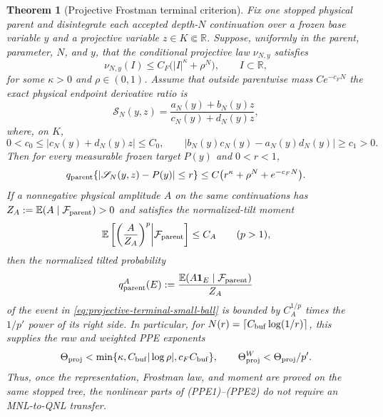 \documentclass[11pt]{article}
\newtheorem{theorem}{Theorem}[section]
\newcommand{\one}{\mathbf 1}
\begin{document}
\begin{theorem}[Projective Frostman terminal criterion]
\label{thm:projective-frostman-terminal-PPE}
Fix one stopped physical parent and disintegrate each accepted depth-$N$
continuation over a frozen base variable $y$ and a projective variable
$z\in K\Subset\mathbb R$.  Suppose, uniformly in the parent, parameter,
$N$, and $y$, that the conditional projective law $\nu_{N,y}$ satisfies
\begin{equation}
\label{eq:projective-terminal-frostman}
 \nu_{N,y}(I)
 \le C_F\bigl(|I|^\kappa+\rho^N\bigr),
 \qquad I\subset\mathbb R,
\end{equation}
for some $\kappa>0$ and $\rho\in(0,1)$.  Assume that outside parentwise
mass $Ce^{-c_FN}$ the exact physical endpoint derivative ratio is
\begin{equation}
\label{eq:projective-terminal-mobius}
 \mathscr S_N(y,z)
 =\frac{a_N(y)+b_N(y)z}{c_N(y)+d_N(y)z},
\end{equation}
where, on $K$,
\begin{equation}
\label{eq:projective-terminal-transversality}
 0<c_0\le |c_N(y)+d_N(y)z|\le C_0,
 \qquad
 |b_N(y)c_N(y)-a_N(y)d_N(y)|\ge c_1>0.
\end{equation}
Then for every measurable frozen target $P(y)$ and $0<r<1$,
\begin{equation}
\label{eq:projective-terminal-small-ball}
 q_{\rm parent}
 \{ |\mathscr S_N(y,z)-P(y)|\le r\}
 \le C\bigl(r^\kappa+\rho^N+e^{-c_FN}\bigr).
\end{equation}
If a nonnegative physical amplitude $A$ on the same continuations has
$Z_A:=\mathbb E(A\mid\mathcal F_{\rm parent})>0$ and satisfies the
normalized-tilt moment
\begin{equation}
\label{eq:projective-terminal-amplitude-moment}
 \mathbb E\left[
 \left(\frac A{Z_A}\right)^p
 \middle|\mathcal F_{\rm parent}\right]\le C_A
 \qquad(p>1),
\end{equation}
then the normalized tilted probability
\[
 q_{\rm parent}^{A}(E):=
 \frac{\mathbb E(A\one_E\mid\mathcal F_{\rm parent})}{Z_A}
\]
of the event in \eqref{eq:projective-terminal-small-ball} is bounded by
$C_A^{1/p}$ times the $1/p'$ power of its right side.  In particular, for
$N(r)=\lceil C_{\rm buf}\log(1/r)\rceil$, this supplies the raw and weighted
PPE exponents
\begin{equation}
\label{eq:projective-terminal-PPE-exponents}
 \Theta_{\rm proj}
 <\min\{\kappa,C_{\rm buf}|\log\rho|,c_FC_{\rm buf}\},
 \qquad
 \Theta_{\rm proj}^{W}<\Theta_{\rm proj}/p'.
\end{equation}
Thus, once the representation, Frostman law, and moment are proved on the
same stopped tree, the nonlinear parts of \textup{(PPE1)--(PPE2)} do not
require an MNL-to-QNL transfer.
\end{theorem}
\end{document}
